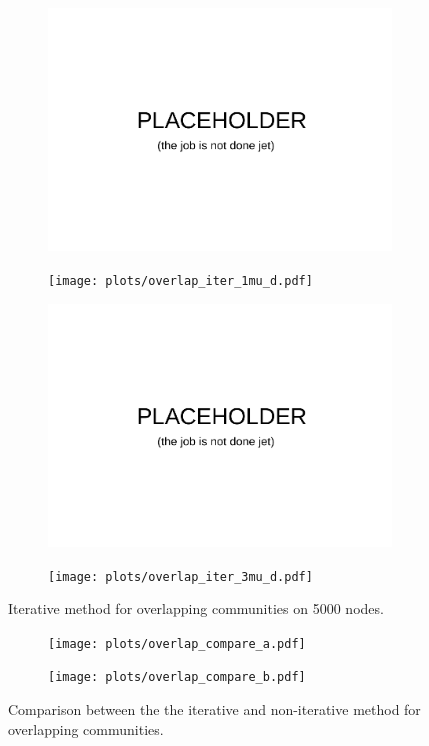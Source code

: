 \begin{figure}
    \centering
    \begin{subfigure}{0.5\textwidth}
    \includegraphics[width=0.8\linewidth]{plots/placeholder.pdf}
    \end{subfigure}%
    \begin{subfigure}{0.5\textwidth}
    \texttt{[image: plots/overlap\_iter\_1mu\_d.pdf]}
    \end{subfigure}
    \begin{subfigure}{0.5\textwidth}
    \includegraphics[width=0.8\linewidth]{plots/placeholder.pdf}
    \end{subfigure}%
    \begin{subfigure}{0.5\textwidth}
    \texttt{[image: plots/overlap\_iter\_3mu\_d.pdf]}
    \end{subfigure}
    \label{fig:iter_overlap_5000N}
    \caption{Iterative method for overlapping communities on 5000 nodes.}
\end{figure}

\begin{figure}
    \centering
    \begin{subfigure}{0.5\textwidth}
    \texttt{[image: plots/overlap\_compare\_a.pdf]}
    \end{subfigure}%
    \begin{subfigure}{0.5\textwidth}
    \texttt{[image: plots/overlap\_compare\_b.pdf]}
    \end{subfigure}
    \label{fig:compare_iter_overlap}
    \caption{Comparison between the the iterative and non-iterative method for overlapping communities.}
\end{figure}


